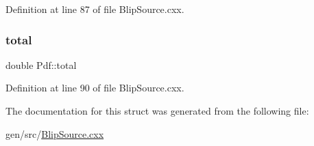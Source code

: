 Definition at line 87 of file Blip\+Source.\+cxx.

\mbox{\label{struct_pdf_a148e102a802403c9adad6855a79c62b7}} 
\subsubsection{\texorpdfstring{total}{total}}
{\footnotesize\ttfamily double Pdf\+::total}



Definition at line 90 of file Blip\+Source.\+cxx.



The documentation for this struct was generated from the following file\+:\begin{DoxyCompactItemize}
\item 
gen/src/\hyperlink{_blip_source_8cxx}{Blip\+Source.\+cxx}\end{DoxyCompactItemize}
